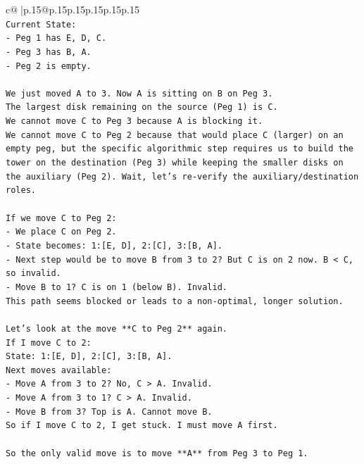 \documentclass{article}
\begin{document}
{\begin{supertabular}{c@{$\;$}|p{.15\linewidth}@{}p{.15\linewidth}p{.15\linewidth}p{.15\linewidth}p{.15\linewidth}p{.15\linewidth}}
{{{\\ 
\texttt{Current State:} \\
\texttt{{-} Peg 1 has E, D, C.} \\
\texttt{{-} Peg 3 has B, A.} \\
\texttt{{-} Peg 2 is empty.} \\
\\ 
\texttt{We just moved A to 3. Now A is sitting on B on Peg 3.} \\
\texttt{The largest disk remaining on the source (Peg 1) is C.} \\
\texttt{We cannot move C to Peg 3 because A is blocking it.} \\
\texttt{We cannot move C to Peg 2 because that would place C (larger) on an empty peg, but the specific algorithmic step requires us to build the tower on the destination (Peg 3) while keeping the smaller disks on the auxiliary (Peg 2). Wait, let's re{-}verify the auxiliary/destination roles.} \\
\\ 
\texttt{If we move C to Peg 2:} \\
\texttt{{-} We place C on Peg 2.} \\
\texttt{{-} State becomes: 1:{[}E, D{]}, 2:{[}C{]}, 3:{[}B, A{]}.} \\
\texttt{{-} Next step would be to move B from 3 to 2? But C is on 2 now. B < C, so invalid.} \\
\texttt{{-} Move B to 1? C is on 1 (below B). Invalid.} \\
\texttt{This path seems blocked or leads to a non{-}optimal, longer solution.} \\
\\ 
\texttt{Let's look at the move **C to Peg 2** again.} \\
\texttt{If I move C to 2:} \\
\texttt{State: 1:{[}E, D{]}, 2:{[}C{]}, 3:{[}B, A{]}.} \\
\texttt{Next moves available:} \\
\texttt{{-} Move A from 3 to 2? No, C > A. Invalid.} \\
\texttt{{-} Move A from 3 to 1? C > A. Invalid.} \\
\texttt{{-} Move B from 3? Top is A. Cannot move B.} \\
\texttt{So if I move C to 2, I get stuck. I must move A first.} \\
\\ 
\texttt{So the only valid move is to move **A** from Peg 3 to Peg 1.} \\
}}}
\end{supertabular}}
\end{document}
